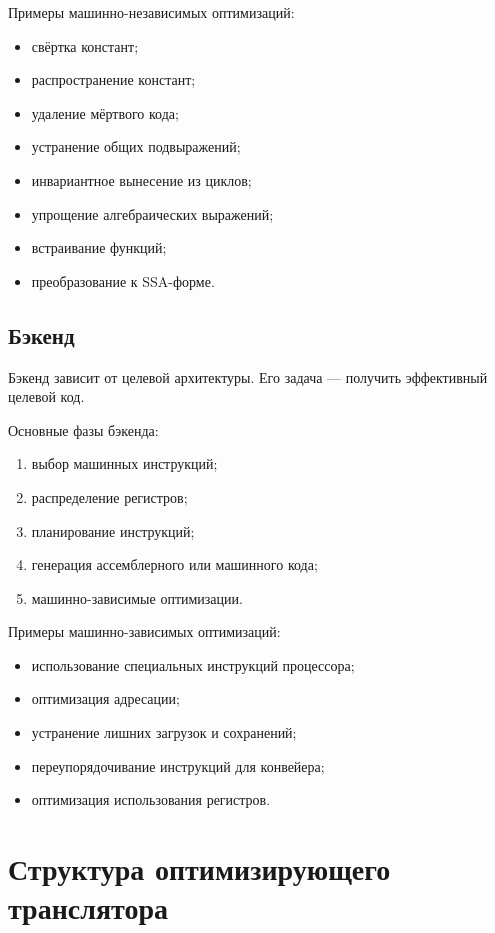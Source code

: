 \documentclass[12pt,a4paper]{article}
\begin{document}
Примеры машинно-независимых оптимизаций:
\begin{itemize}
    \item свёртка констант;
    \item распространение констант;
    \item удаление мёртвого кода;
    \item устранение общих подвыражений;
    \item инвариантное вынесение из циклов;
    \item упрощение алгебраических выражений;
    \item встраивание функций;
    \item преобразование к SSA-форме.
\end{itemize}

\subsection{Бэкенд}

Бэкенд зависит от целевой архитектуры. Его задача --- получить эффективный целевой код.

Основные фазы бэкенда:
\begin{enumerate}
    \item выбор машинных инструкций;
    \item распределение регистров;
    \item планирование инструкций;
    \item генерация ассемблерного или машинного кода;
    \item машинно-зависимые оптимизации.
\end{enumerate}

Примеры машинно-зависимых оптимизаций:
\begin{itemize}
    \item использование специальных инструкций процессора;
    \item оптимизация адресации;
    \item устранение лишних загрузок и сохранений;
    \item переупорядочивание инструкций для конвейера;
    \item оптимизация использования регистров.
\end{itemize}

\section{Структура оптимизирующего транслятора}
\end{document}
